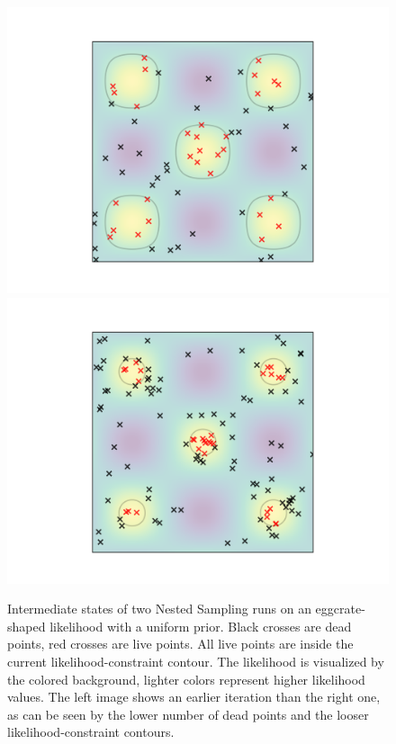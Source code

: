 \documentclass[12pt, a4paper]{report}
\begin{document}
\begin{figure}
    \centering
    \includegraphics[trim={3cm 1cm 2.4cm 1cm}, clip, scale=0.65]{ns_eggcrate_example_1.png}
    \includegraphics[trim={2.4cm 1cm 3cm 1cm}, clip, scale=0.65]{ns_eggcrate_example_2.png}
    \caption{Intermediate states of two Nested Sampling runs on an eggcrate-shaped likelihood with a uniform prior. Black crosses are dead points, red crosses are live points. All live points are inside the current likelihood-constraint contour. The likelihood is visualized by the colored background, lighter colors represent higher likelihood values. The left image shows an earlier iteration than the right one, as can be seen by the lower number of dead points and the looser likelihood-constraint contours.}
    \label{fig:ns_eggcrate_example}
\end{figure}
\end{document}
